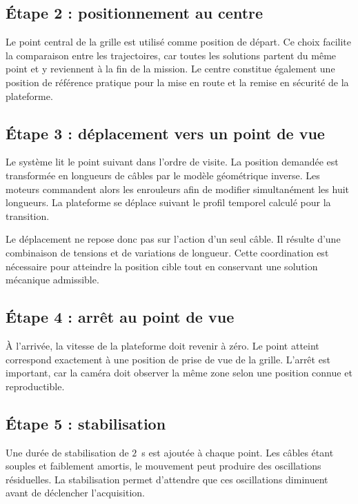 \subsection{Étape 2 : positionnement au centre}

Le point central de la grille est utilisé comme position de départ. Ce choix facilite la comparaison entre les trajectoires, car toutes les solutions partent du même point et y reviennent à la fin de la mission. Le centre constitue également une position de référence pratique pour la mise en route et la remise en sécurité de la plateforme.

\subsection{Étape 3 : déplacement vers un point de vue}

Le système lit le point suivant dans l'ordre de visite. La position demandée est transformée en longueurs de câbles par le modèle géométrique inverse. Les moteurs commandent alors les enrouleurs afin de modifier simultanément les huit longueurs. La plateforme se déplace suivant le profil temporel calculé pour la transition.

Le déplacement ne repose donc pas sur l'action d'un seul câble. Il résulte d'une combinaison de tensions et de variations de longueur. Cette coordination est nécessaire pour atteindre la position cible tout en conservant une solution mécanique admissible.

\subsection{Étape 4 : arrêt au point de vue}

À l'arrivée, la vitesse de la plateforme doit revenir à zéro. Le point atteint correspond exactement à une position de prise de vue de la grille. L'arrêt est important, car la caméra doit observer la même zone selon une position connue et reproductible.

\subsection{Étape 5 : stabilisation}

Une durée de stabilisation de $2$~s est ajoutée à chaque point. Les câbles étant souples et faiblement amortis, le mouvement peut produire des oscillations résiduelles. La stabilisation permet d'attendre que ces oscillations diminuent avant de déclencher l'acquisition.

